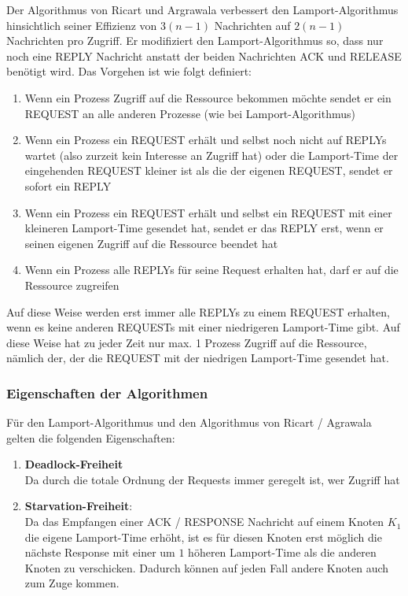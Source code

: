 Der Algorithmus von Ricart und Argrawala verbessert den Lamport-Algorithmus hinsichtlich seiner Effizienz von $3(n-1)$ Nachrichten auf $2(n-1)$ Nachrichten pro Zugriff. Er modifiziert den Lamport-Algorithmus so, dass nur noch eine REPLY Nachricht anstatt der beiden Nachrichten ACK und RELEASE benötigt wird. Das Vorgehen ist wie folgt definiert:
\begin{enumerate}
    \item Wenn ein Prozess Zugriff auf die Ressource bekommen möchte sendet er ein REQUEST an alle anderen Prozesse (wie bei Lamport-Algorithmus)
    \item Wenn ein Prozess ein REQUEST erhält und selbst noch nicht auf REPLYs wartet (also zurzeit kein Interesse an Zugriff hat) oder die Lamport-Time der eingehenden REQUEST kleiner ist als die der eigenen REQUEST, sendet er sofort ein REPLY
    \item Wenn ein Prozess ein REQUEST erhält und selbst ein REQUEST mit einer kleineren Lamport-Time gesendet hat, sendet er das REPLY erst, wenn er seinen eigenen Zugriff auf die Ressource beendet hat
    \item Wenn ein Prozess alle REPLYs für seine Request erhalten hat, darf er auf die Ressource zugreifen
\end{enumerate}

Auf diese Weise werden erst immer alle REPLYs zu einem REQUEST erhalten, wenn es keine anderen REQUESTs mit einer niedrigeren Lamport-Time gibt. Auf diese Weise hat zu jeder Zeit nur max. 1 Prozess Zugriff auf die Ressource, nämlich der, der die REQUEST mit der niedrigen Lamport-Time gesendet hat.

\subsubsection{Eigenschaften der Algorithmen}

Für den Lamport-Algorithmus und den Algorithmus von Ricart / Agrawala gelten die folgenden Eigenschaften:
\begin{enumerate}
    \item \textbf{Deadlock-Freiheit}\\
          Da durch die totale Ordnung der Requests immer geregelt ist, wer Zugriff hat
    \item \textbf{Starvation-Freiheit}:\\
          Da das Empfangen einer ACK / RESPONSE Nachricht auf einem Knoten $K_{1}$ die eigene Lamport-Time erhöht, ist es für diesen Knoten erst möglich die nächste Response mit einer um $1$ höheren Lamport-Time als die anderen Knoten zu verschicken. Dadurch können auf jeden Fall andere Knoten auch zum Zuge kommen.
\end{enumerate}